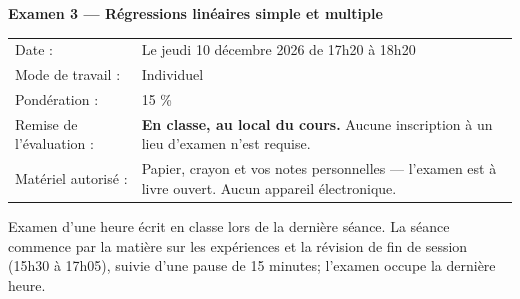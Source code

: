 \documentclass[10pt]{article}
\newcommand{\ulsubsub}[1]{%
  \needspace{3\baselineskip}%
  \vspace{8pt}%
  {\headfont\fontsize{11}{13}\selectfont\bfseries #1}\par
  \vspace{1pt}%
}
\begin{document}
\ulsubsub{Examen 3 --- Régressions linéaires simple et multiple}
{\fontsize{9.5}{12.5}\selectfont
\begin{tabular}{@{}L{1.9in}L{5.4in}@{}}
Date : & Le jeudi 10 décembre 2026 de 17h20 à 18h20\\
Mode de travail : & Individuel\\
Pondération : & 15 \%\\
Remise de l'évaluation : & \textbf{En classe, au local du cours.} Aucune inscription à un lieu d'examen n'est requise.\\
Matériel autorisé : & Papier, crayon et vos notes personnelles --- l'examen est à livre ouvert. Aucun appareil électronique.\\
\end{tabular}\par
\vspace{4pt}
Examen d'une heure écrit en classe lors de la dernière séance. La séance commence par la matière sur les expériences et la révision de fin de session (15h30 à 17h05), suivie d'une pause de 15 minutes; l'examen occupe la dernière heure.\par}
\end{document}
